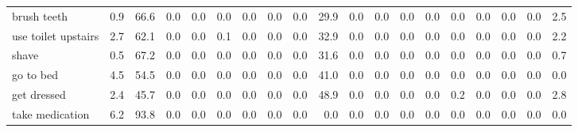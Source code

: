 \documentclass{article}
\begin{document}
\begin{sideways}
\begin{tabular}{lrrrrrrrrrrrrrrrrrr}
brush teeth                   &         0.9 &               66.6 &           0.0 &                          0.0 &                0.0 &                0.0 &                        0.0 &          0.0 &             29.9 &                0.0 &                    0.0 &                      0.0 &                  0.0 &                   0.0 &              0.0 &              0.0 &                                  0.0 &          2.5 \\
use toilet upstairs           &         2.7 &               62.1 &           0.0 &                          0.0 &                0.1 &                0.0 &                        0.0 &          0.0 &             32.9 &                0.0 &                    0.0 &                      0.0 &                  0.0 &                   0.0 &              0.0 &              0.0 &                                  0.0 &          2.2 \\
shave                         &         0.5 &               67.2 &           0.0 &                          0.0 &                0.0 &                0.0 &                        0.0 &          0.0 &             31.6 &                0.0 &                    0.0 &                      0.0 &                  0.0 &                   0.0 &              0.0 &              0.0 &                                  0.0 &          0.7 \\
go to bed                     &         4.5 &               54.5 &           0.0 &                          0.0 &                0.0 &                0.0 &                        0.0 &          0.0 &             41.0 &                0.0 &                    0.0 &                      0.0 &                  0.0 &                   0.0 &              0.0 &              0.0 &                                  0.0 &          0.0 \\
get dressed                   &         2.4 &               45.7 &           0.0 &                          0.0 &                0.0 &                0.0 &                        0.0 &          0.0 &             48.9 &                0.0 &                    0.0 &                      0.0 &                  0.0 &                   0.2 &              0.0 &              0.0 &                                  0.0 &          2.8 \\
take medication               &         6.2 &               93.8 &           0.0 &                          0.0 &                0.0 &                0.0 &                        0.0 &          0.0 &              0.0 &                0.0 &                    0.0 &                      0.0 &                  0.0 &                   0.0 &              0.0 &              0.0 &                                  0.0 &          0.0 \\

\end{tabular}
\end{sideways}
\end{document}
